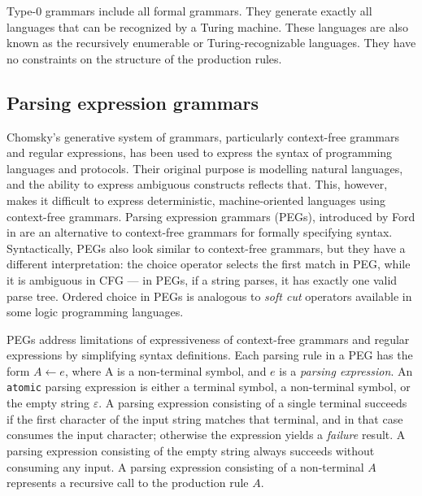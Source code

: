 \documentclass[english,engineering]{wizthesis}
\begin{document}
Type-0 grammars include all formal grammars. They generate exactly all languages
that can be recognized by a Turing machine. These languages are also known as
the recursively enumerable or Turing-recognizable languages. They have no
constraints on the structure of the production rules.

\subsection{Parsing expression grammars} \label{sbs:pegs}

Chomsky's generative system of grammars, particularly context-free grammars and
regular expressions, has been used to express the syntax of programming
languages and protocols. Their original purpose is modelling natural languages,
and the ability to express ambiguous constructs reflects that. This, however,
makes it difficult to express deterministic, machine-oriented languages using
context-free grammars. Parsing expression grammars (PEGs), introduced by Ford in
\cite{ford-2004} are an alternative to context-free grammars for formally
specifying syntax. Syntactically, PEGs also look similar to context-free
grammars, but they have a different interpretation: the choice operator selects
the first match in PEG, while it is ambiguous in CFG --- in PEGs, if a string
parses, it has exactly one valid parse tree. Ordered choice in PEGs is analogous
to \emph{soft cut} operators available in some logic programming languages.

PEGs address limitations of expressiveness of context-free grammars and regular
expressions by simplifying syntax definitions. Each parsing rule in a PEG has
the form $A \leftarrow e$, where A is a non-terminal symbol, and $e$ is a
\emph{parsing expression}. An \texttt{atomic} parsing expression is either a
terminal symbol, a non-terminal symbol, or the empty string $\varepsilon$. A
parsing expression consisting of a single terminal succeeds if the first
character of the input string matches that terminal, and in that case consumes
the input character; otherwise the expression yields a \emph{failure} result. A
parsing expression consisting of the empty string always succeeds without
consuming any input. A parsing expression consisting of a non-terminal $A$
represents a recursive call to the production rule $A$. 
\end{document}
